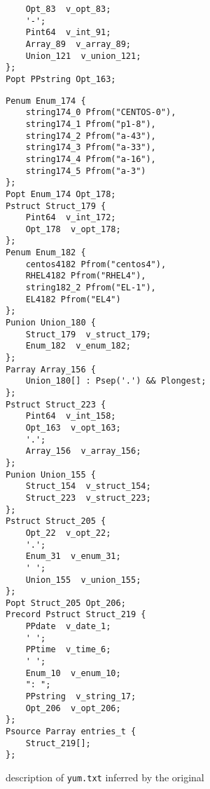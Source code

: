 {\begin{figure}[t]
{\begin{minipage}[t]{0.33\columnwidth}
\begin{verbatim}
	Opt_83  v_opt_83;
	'-';
	Pint64  v_int_91;
	Array_89  v_array_89;
	Union_121  v_union_121;
};
Popt PPstring Opt_163;
\end{verbatim}
\end{minipage}
\begin{minipage}[t]{0.33\columnwidth}
\begin{verbatim}
Penum Enum_174 {
	string174_0 Pfrom("CENTOS-0"),
	string174_1 Pfrom("p1-8"),
	string174_2 Pfrom("a-43"),
	string174_3 Pfrom("a-33"),
	string174_4 Pfrom("a-16"),
	string174_5 Pfrom("a-3")
};
Popt Enum_174 Opt_178;
Pstruct Struct_179 {
	Pint64  v_int_172;
	Opt_178  v_opt_178;
};
Penum Enum_182 {
	centos4182 Pfrom("centos4"),
	RHEL4182 Pfrom("RHEL4"),
	string182_2 Pfrom("EL-1"),
	EL4182 Pfrom("EL4")
};
Punion Union_180 {
	Struct_179  v_struct_179;
	Enum_182  v_enum_182;
};
Parray Array_156 {
	Union_180[] : Psep('.') && Plongest;
};
Pstruct Struct_223 {
	Pint64  v_int_158;
	Opt_163  v_opt_163;
	'.';
	Array_156  v_array_156;
};
Punion Union_155 {
	Struct_154  v_struct_154;
	Struct_223  v_struct_223;
};
Pstruct Struct_205 {
	Opt_22  v_opt_22;
	'.';
	Enum_31  v_enum_31;
	' ';
	Union_155  v_union_155;
};
Popt Struct_205 Opt_206;
Precord Pstruct Struct_219 {
	PPdate  v_date_1;
	' ';
	PPtime  v_time_6;
	' ';
	Enum_10  v_enum_10;
	": ";
	PPstring  v_string_17;
	Opt_206  v_opt_206;
};
Psource Parray entries_t {
	Struct_219[];
};
\end{verbatim}
\end{minipage}
}
\caption{\pads{} description of {\tt yum.txt} inferred by the original \learnpads}\label{fig:yum-bad}
\end{figure}
}


